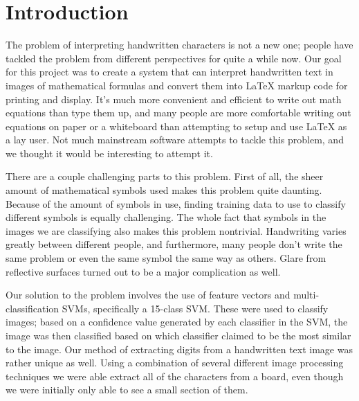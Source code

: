 \section{Introduction}

The problem of interpreting handwritten characters is not a new one; people have tackled the problem from different perspectives for quite a while now.  Our goal for this project was to create a system that can interpret handwritten text in images of mathematical formulas and convert them into LaTeX markup code for printing and display.  It's much more convenient and efficient to write out math equations than type them up, and many people are more comfortable writing out equations on paper or a whiteboard than attempting to setup and use LaTeX as a lay user.  Not much mainstream software attempts to tackle this problem, and we thought it would be interesting to attempt it.

There are a couple challenging parts to this problem.  First of all, the sheer amount of mathematical symbols used makes this problem quite daunting.  Because of the amount of symbols in use, finding training data to use to classify different symbols is equally challenging.  The whole fact that symbols in the images we are classifying also makes this problem nontrivial.  Handwriting varies greatly between different people, and furthermore, many people don't write the same problem or even the same symbol the same way as others.  Glare from reflective surfaces turned out to be a major complication as well.

Our solution to the problem involves the use of feature vectors and multi-classification SVMs, specifically a 15-class SVM.  These were used to classify images; based on a confidence value generated by each classifier in the SVM, the image was then classified based on which classifier claimed to be the most similar to the image.  Our method of extracting digits from a handwritten text image was rather unique as well. Using a combination of several different image processing techniques we were able extract all of the characters from a board, even though we were initially only able to see a small section of them.
